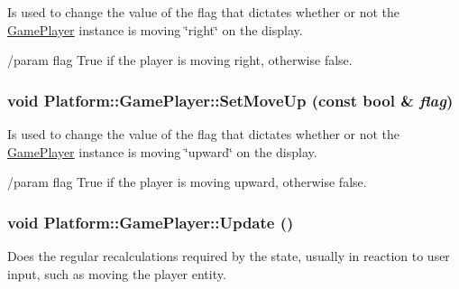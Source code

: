 Is used to change the value of the flag that dictates whether or not the \hyperlink{class_platform_1_1_game_player}{GamePlayer} instance is moving \char`\"{}right\char`\"{} on the display.

/param flag True if the player is moving right, otherwise false. \hypertarget{class_platform_1_1_game_player_630364b025ecf7959adcfbcd772b4e17}{
\subsubsection[{SetMoveUp}]{\setlength{\rightskip}{0pt plus 5cm}void Platform::GamePlayer::SetMoveUp (const bool \& {\em flag})}}
\label{d4/d4e/class_platform_1_1_game_player_630364b025ecf7959adcfbcd772b4e17}


Is used to change the value of the flag that dictates whether or not the \hyperlink{class_platform_1_1_game_player}{GamePlayer} instance is moving \char`\"{}upward\char`\"{} on the display.

/param flag True if the player is moving upward, otherwise false. \hypertarget{class_platform_1_1_game_player_cebe99ba854db79cf0c0100d85af6485}{
\subsubsection[{Update}]{\setlength{\rightskip}{0pt plus 5cm}void Platform::GamePlayer::Update ()}}
\label{d4/d4e/class_platform_1_1_game_player_cebe99ba854db79cf0c0100d85af6485}


Does the regular recalculations required by the state, usually in reaction to user input, such as moving the player entity. 